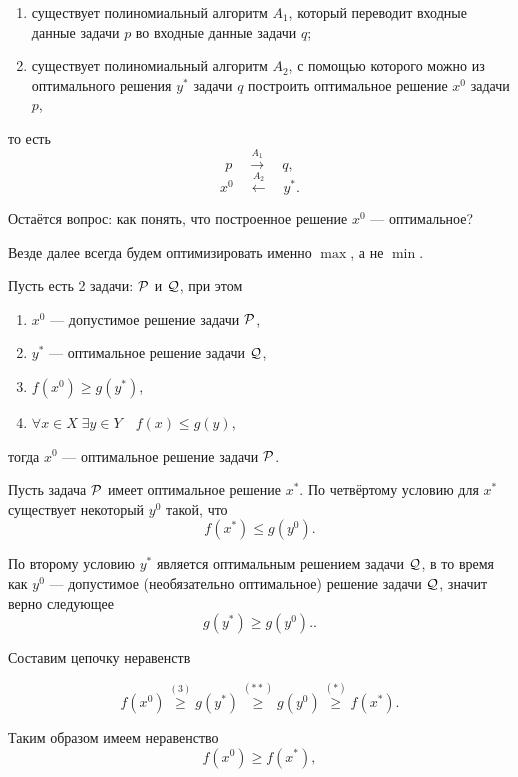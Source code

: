 \begin{enumerate}[nosep]
	\item существует полиномиальный алгоритм $A_1$, который переводит входные данные задачи $p$ во входные данные задачи $q$;
	
	\item существует полиномиальный алгоритм $A_2$, с помощью которого можно из оптимального решения $y^*$ задачи $q$ построить оптимальное решение $x^0$ задачи $p$,
\end{enumerate}

то есть
\[
p \quad \stackrel{A_1}{\longrightarrow} \quad q,
\]
\[
x^0 \quad \stackrel{A_2}{\longleftarrow} \quad y^*.
\]

Остаётся вопрос: как понять, что построенное решение $x^0$ --- оптимальное?

\remark

Везде далее всегда будем оптимизировать именно $\max$, а не $\min$.

\label{fact:reduction_to_other_problem}

Пусть есть 2 задачи: $\P$ и $\Q$, при этом
\begin{enumerate}[nosep]
	\item $x^0$ --- допустимое решение задачи $\P$,
	
	\item $y^*$ --- оптимальное решение задачи $\Q$,
	
	\item $f(x^0) \ge g(y^*)$,
	
	\item $\forall x \in X \; \exists y \in Y \quad f(x) \le g(y)$,
\end{enumerate}

тогда $x^0$ --- оптимальное решение задачи $\P$.

\prooof

Пусть задача $\P$ имеет оптимальное решение $x^*$. По четвёртому условию для $x^*$ существует некоторый $y^0$ такой, что 
\[
f(x^*) \le g(y^0). \tag{*}
\]

По второму условию $y^*$ является оптимальным решением задачи $\Q$, в то время как $y^0$ --- допустимое (необязательно оптимальное) решение задачи $\Q$, значит верно следующее
\[
g(y^*) \ge g(y^0). \tag{**}.
\]

Составим цепочку неравенств

\[
f(x^0) \stackrel{(3)}{\ge} g(y^*) \stackrel{(**)}{\ge} g(y^0) \stackrel{(*)}{\ge} f(x^*).
\]

Таким образом имеем неравенство
\[
f(x^0) \ge f(x^*),
\]

